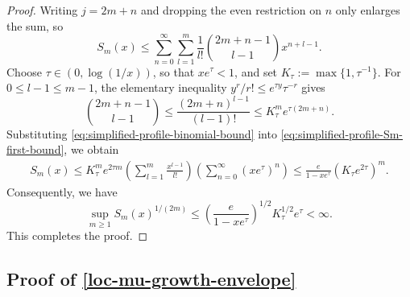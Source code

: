 \documentclass[10pt,reqno]{article}
\numberwithin{equation}{section}
\theoremstyle{plain}
\theoremstyle{definition}
\begin{document}
\begin{proof}
Writing \(j=2m+n\) and dropping the even restriction on \(n\) only enlarges the sum, so
\begin{equation}\label{eq:simplified-profile-Sm-first-bound}
S_m(x) \leq \sum_{n=0}^{\infty} \sum_{l=1}^{m} \frac{1}{l!} \binom{2m+n-1}{l-1} x^{n+l-1}.
\end{equation}
Choose \(\tau\in(0,\log(1/x))\), so that \(xe^\tau<1\), and set $ K_\tau:=\max\{1,\tau^{-1}\}$. For \(0\leq l-1\leq m-1\), the elementary inequality \(y^r/r!\leq e^{\tau y}\tau^{-r}\) gives
\begin{equation}\label{eq:simplified-profile-binomial-bound}
\binom{2m+n-1}{l-1} \leq \frac{(2m+n)^{l-1}}{(l-1)!} \leq K_\tau^m e^{\tau(2m+n)} .
\end{equation}
Substituting \cref{eq:simplified-profile-binomial-bound} into \cref{eq:simplified-profile-Sm-first-bound}, we obtain
\begin{align}
S_m(x) \leq K_\tau^m e^{2\tau m} \left( \sum_{l=1}^{m}\frac{x^{l-1}}{l!} \right) \left( \sum_{n=0}^{\infty}(xe^\tau)^n \right) \leq \frac{e}{1-xe^\tau} (K_\tau e^{2\tau} )^m .
\label{eq:simplified-profile-Sm-exponential-bound}
\end{align}
Consequently, we have
\begin{equation}\label{eq:simplified-profile-Sm-root-bound}
\sup_{m\geq1}S_m(x)^{1/(2m)} \leq \left(\frac{e}{1-xe^\tau}\right)^{1/2} K_\tau^{1/2}e^\tau <\infty .
\end{equation}
This completes the proof.
\end{proof}



\subsection{Proof of \cref{loc-mu-growth-envelope}}\label{proof-of-loc-mu-growth-envelope}
\end{document}
